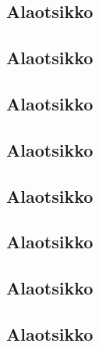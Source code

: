 \documentclass[a4paper]{article}
\begin{document}
\subsection{Alaotsikko}

\subsection{Alaotsikko}
\subsection{Alaotsikko}

\subsection{Alaotsikko}

\subsection{Alaotsikko}
\subsection{Alaotsikko}

\subsection{Alaotsikko}

\subsection{Alaotsikko}
\end{document}
